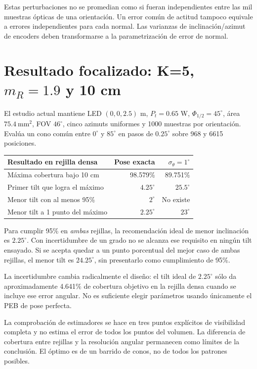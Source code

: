 \documentclass[11pt,a4paper]{article}
\begin{document}
Estas perturbaciones no se promedian como si fueran independientes entre las mil muestras ópticas de una orientación. Un error común de actitud tampoco equivale a errores independientes para cada normal. Las varianzas de inclinación/azimut de encoders deben transformarse a la parametrización de error de normal.

\section{Resultado focalizado: K=5, \texorpdfstring{$m_R=1.9$}{mR=1.9} y 10 cm}
El estudio actual mantiene LED $(0,0,2.5)$ m, $P_t=0.65$ W, $\Phi_{1/2}=45^\circ$, área $75.4\ \mathrm{mm}^2$, FOV $46^\circ$, cinco azimuts uniformes y 1000 muestras por orientación. Evalúa un cono común entre $0^\circ$ y $85^\circ$ en pasos de $0.25^\circ$ sobre 968 y 6615 posiciones.
\begin{center}
\begin{tabular}{lrr}
\toprule
Resultado en rejilla densa & Pose exacta & $\sigma_\theta=1^\circ$ \\
\midrule
Máxima cobertura bajo 10 cm & 98.579\% & 89.751\% \\
Primer tilt que logra el máximo & $4.25^\circ$ & $25.5^\circ$ \\
Menor tilt con al menos 95\% & $2^\circ$ & No existe \\
Menor tilt a 1 punto del máximo & $2.25^\circ$ & $23^\circ$ \\
\bottomrule
\end{tabular}
\end{center}
Para cumplir 95\% en \emph{ambas} rejillas, la recomendación ideal de menor inclinación es $2.25^\circ$. Con incertidumbre de un grado no se alcanza ese requisito en ningún tilt ensayado. Si se acepta quedar a un punto porcentual del mejor caso de ambas rejillas, el menor tilt es $24.25^\circ$, sin presentarlo como cumplimiento de 95\%.

La incertidumbre cambia radicalmente el diseño: el tilt ideal de $2.25^\circ$ sólo da aproximadamente 4.641\% de cobertura objetivo en la rejilla densa cuando se incluye ese error angular. No es suficiente elegir parámetros usando únicamente el PEB de pose perfecta.

La comprobación de estimadores se hace en tres puntos explícitos de visibilidad completa y no estima el error de todos los puntos del volumen. La diferencia de cobertura entre rejillas y la resolución angular permanecen como límites de la conclusión. El óptimo es de un barrido de conos, no de todos los patrones posibles.
\end{document}
